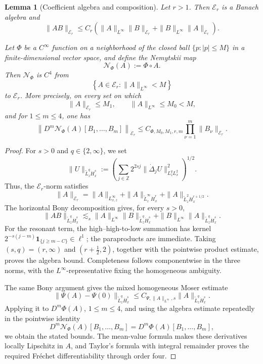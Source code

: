 \documentclass[12pt]{amsart}
\newtheorem{lemma}[theorem]{Lemma}
\theoremstyle{remark}
\theoremstyle{definition}
\numberwithin{equation}{section}
\begin{document}
\begin{lemma}[Coefficient algebra and composition]
\label{lem:coefficient-algebra}
Let \(r>1\).
Then \(\mathcal E_r\) is a Banach algebra and
\begin{equation*}
 \|AB\|_{\mathcal E_r} \leq C_r \left( \|A\|_{L^\infty}\|B\|_{\mathcal E_r} + \|B\|_{L^\infty}\|A\|_{\mathcal E_r} \right).
\end{equation*}

Let \(\Phi\) be a \(C^\infty\) function on a neighborhood of the closed ball \(\{p:|p|\leq M\}\) in a finite-dimensional vector space, and define the Nemytskii map
\[
 \mathcal N_\Phi(A):=\Phi\circ A.
\]
Then \(\mathcal N_\Phi\) is \(C^4\) from 
\[
 \left\{ A\in\mathcal E_r: \|A\|_{L^\infty}<M \right\}
\]
to \(\mathcal E_r\).
More precisely, on every set on which
\[
 \|A\|_{\mathcal E_r}\leq M_1, \qquad \|A\|_{L^\infty}\leq M_0<M,
\]
and for \(1\leq m\leq4\), one has
\begin{equation*}
 \left\| D^m\mathcal N_\Phi(A)[B_1,\ldots,B_m] \right\|_{\mathcal E_r} \leq C_{\Phi,M_0,M_1,r,m} \prod_{\nu=1}^m \|B_\nu\|_{\mathcal E_r}.
\end{equation*}
\end{lemma}

\begin{proof}
For \(s>0\) and \(q\in\{2,\infty\}\), we set
\[
 \|U\|_{\widetilde L^q_z\dot H^s_x} := \left( \sum_{j\in\mathbb Z} 2^{2sj} \|\dot\Delta_jU\|_{L^q_zL^2_x}^2 \right)^{1/2}.
\]
Thus, the \(\mathcal E_r\)-norm satisfies
\[
 \|A\|_{\mathcal E_r} = \|A\|_{L^\infty_{x,z}} + \|A\|_{\widetilde L^\infty_z\dot H^r_x} + \|A\|_{\widetilde L^2_z\dot H^{r+1/2}_x}.
\]
The horizontal Bony decomposition gives, for every \(s>0\),
\[
 \|AB\|_{\widetilde L^q_z\dot H^s_x}
 \lesssim_s \|A\|_{L^\infty}\|B\|_{\widetilde L^q_z\dot H^s_x}
 +\|B\|_{L^\infty}\|A\|_{\widetilde L^q_z\dot H^s_x}.
\]
For the resonant term, the high--high-to-low summation has kernel
\(2^{-s(j-m)}\mathbf1_{\{j\geq m-C\}}\in\ell^1\); the paraproducts are immediate.  
Taking \((s,q)=(r,\infty)\) and
\((r+\frac12,2)\), together with the pointwise product estimate, proves the algebra bound.  
Completeness follows componentwise in the three norms, with the \(L^\infty\)-representative fixing the homogeneous ambiguity.

The same Bony argument gives the mixed homogeneous Moser estimate
\[
 \|\Psi(A)-\Psi(0)\|_{\widetilde L^q_z\dot H^s_x}
 \leq C_{\Psi,\|A\|_{L^\infty},s}
 \|A\|_{\widetilde L^q_z\dot H^s_x}.
\]
Applying it to \(D^m\Phi(A)\), \(1\leq m\leq4\), and using the algebra estimate repeatedly in the pointwise identity
\[
 D^m\mathcal N_\Phi(A)[B_1,\ldots,B_m]
 =D^m\Phi(A)[B_1,\ldots,B_m],
\]
we obtain the stated bounds.  
The mean-value formula makes these derivatives locally Lipschitz in \(A\), and Taylor's formula with integral remainder proves the required Fréchet differentiability through order four.
\end{proof}
\end{document}
